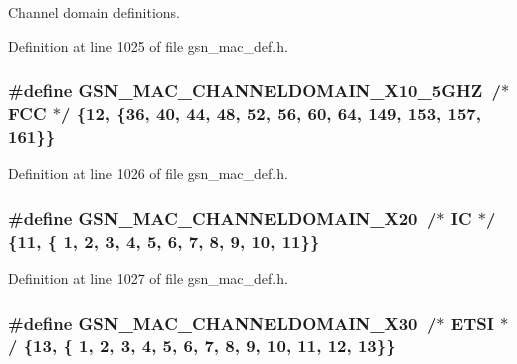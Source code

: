 Channel domain definitions. 



Definition at line 1025 of file gsn\_\-mac\_\-def.h.

\hypertarget{a00642_ga3ad89b43471f5e0ec1a3fb38092a322d}{
\subsubsection[{GSN\_\-MAC\_\-CHANNELDOMAIN\_\-X10\_\-5GHZ}]{\setlength{\rightskip}{0pt plus 5cm}\#define GSN\_\-MAC\_\-CHANNELDOMAIN\_\-X10\_\-5GHZ~/$\ast$ FCC    $\ast$/ \{12, \{36, 40, 44, 48, 52, 56, 60, 64, 149, 153, 157, 161\}\}}}
\label{a00642_ga3ad89b43471f5e0ec1a3fb38092a322d}


Definition at line 1026 of file gsn\_\-mac\_\-def.h.

\hypertarget{a00642_gad25876d674bda6a842556d3b3194ab50}{
\subsubsection[{GSN\_\-MAC\_\-CHANNELDOMAIN\_\-X20}]{\setlength{\rightskip}{0pt plus 5cm}\#define GSN\_\-MAC\_\-CHANNELDOMAIN\_\-X20~/$\ast$ IC     $\ast$/ \{11, \{ 1,  2,  3,  4,  5,  6,  7,  8,  9, 10, 11\}\}}}
\label{a00642_gad25876d674bda6a842556d3b3194ab50}


Definition at line 1027 of file gsn\_\-mac\_\-def.h.

\hypertarget{a00642_ga9bdd8d819efafbf6ee3f9a9372b8b4ab}{
\subsubsection[{GSN\_\-MAC\_\-CHANNELDOMAIN\_\-X30}]{\setlength{\rightskip}{0pt plus 5cm}\#define GSN\_\-MAC\_\-CHANNELDOMAIN\_\-X30~/$\ast$ ETSI   $\ast$/ \{13, \{ 1,  2,  3,  4,  5,  6,  7,  8,  9, 10, 11, 12, 13\}\}}}
\label{a00642_ga9bdd8d819efafbf6ee3f9a9372b8b4ab}


